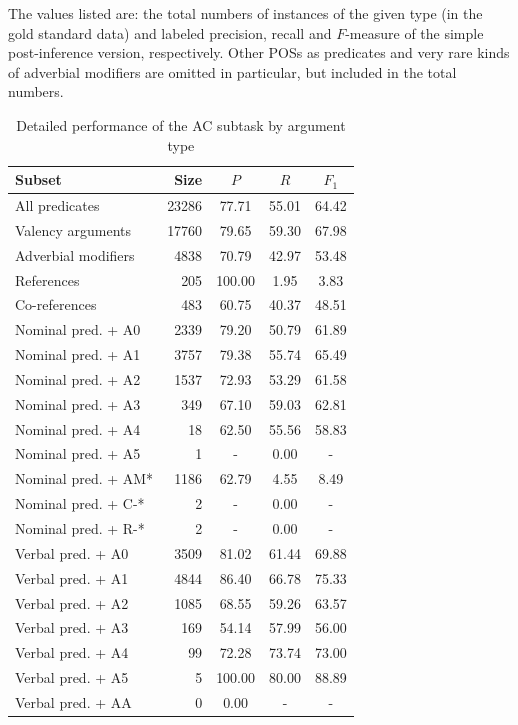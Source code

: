\documentclass[12pt,notitlepage]{report}
\begin{document}
\begin{table}[p]\footnotesize
\caption{Detailed performance of the AC subtask by argument type}\label{tab:ac-output}
The values listed are: the total numbers of instances of the given type (in the gold standard data) and labeled precision, recall and $F$-measure of the simple post-inference version, respectively. Other POSs as predicates and very rare kinds of adverbial modifiers are omitted in particular, but included in the total numbers.
\begin{center}
\begin{tabular}{|l|r|c|c|c|}\hline
\bf Subset & \bf Size & $P$ & $R$ & $F_1$ \\\hline\hline
All predicates & 23286 & 77.71 & 55.01 & 64.42 \\\hline
Valency arguments & 17760 & 79.65 & 59.30 & 67.98 \\
Adverbial modifiers & 4838 & 70.79 & 42.97 & 53.48 \\
References & 205 & 100.00 & 1.95 & 3.83 \\
Co-references & 483 & 60.75 & 40.37 & 48.51 \\\hline\hline
Nominal pred. + A0 & 2339 & 79.20 & 50.79 & 61.89 \\
Nominal pred. + A1 & 3757 & 79.38 & 55.74 & 65.49 \\
Nominal pred. + A2 & 1537 & 72.93 & 53.29 & 61.58 \\
Nominal pred. + A3 & 349 & 67.10 & 59.03 & 62.81 \\
Nominal pred. + A4 & 18 & 62.50 & 55.56 & 58.83 \\
Nominal pred. + A5 & 1 & - & 0.00 & - \\
Nominal pred. + AM* & 1186 & 62.79 & 4.55 & 8.49 \\
Nominal pred. + C-* & 2 & - & 0.00 & - \\
Nominal pred. + R-* & 2 & - & 0.00 & - \\
Verbal pred. + A0 & 3509 & 81.02 & 61.44 & 69.88 \\
Verbal pred. + A1 & 4844 & 86.40 & 66.78 & 75.33 \\
Verbal pred. + A2 & 1085 & 68.55 & 59.26 & 63.57 \\
Verbal pred. + A3 & 169 & 54.14 & 57.99 & 56.00 \\
Verbal pred. + A4 & 99 & 72.28 & 73.74 & 73.00 \\
Verbal pred. + A5 & 5 & 100.00 & 80.00 & 88.89 \\
Verbal pred. + AA & 0 & 0.00 & - & - \\

\end{tabular}
\end{center}
\end{table}
\end{document}
